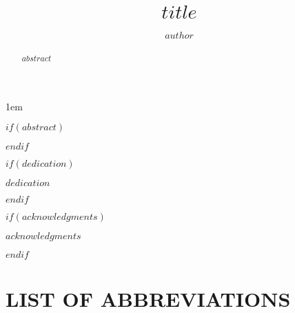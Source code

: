 \documentclass[draftthesis,tocnosub,noragright,centerchapter,12pt]{uiucecethesis09}
\title{$title$}
\author{$author$}
\begin{document}
%

%
\maketitle

\parindent 1em%

\frontmatter

%
$if(abstract)$
\begin{abstract}
$abstract$
\end{abstract}
$endif$



%

$if(dedication)$
\begin{dedication}
$dedication$
\end{dedication}
$endif$

%
$if(acknowledgments)$
\begin{acknowledgments}
$acknowledgments$
\end{acknowledgments}
$endif$

%
\tableofcontents

%
\listoftables

%
\listoffigures

%
\chapter{LIST OF ABBREVIATIONS}
\end{document}
